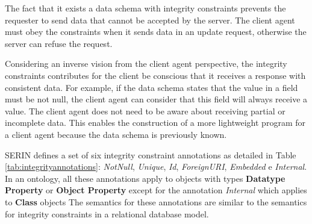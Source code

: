 \documentclass{singlecol-new}
\theoremstyle{TH}{
\newtheorem{lemma}{Lemma}
\newtheorem{theorem}[lemma]{Theorem}
\newtheorem{corrolary}[lemma]{Corrolary}
\newtheorem{conjecture}[lemma]{Conjecture}
\newtheorem{proposition}[lemma]{Proposition}
\newtheorem{claim}[lemma]{Claim}
\newtheorem{stheorem}[lemma]{Wrong Theorem}
\newtheorem{algorithm}{Algorithm}
}
\theoremstyle{THrm}{
\newtheorem{definition}{Definition}[section]
\newtheorem{question}{Question}[section]
\newtheorem{remark}{Remark}
\newtheorem{scheme}{Scheme}
}
\theoremstyle{THhit}{
\newtheorem{case}{Case}[section]
}
\begin{document}
The fact that it exists a data schema with integrity constraints prevents the requester to send data that cannot be accepted by the server. 
The client agent must obey the constraints when it sends data in an update request, otherwise the server can refuse the request.

Considering an inverse vision from the client agent perspective, the integrity constraints contributes for the client be conscious that it receives a response with consistent data.
For example, if the data schema states that the value in a field must be not null, the client agent can consider that this field will always receive a value. 
The client agent does not need to be aware about receiving partial or incomplete data. 
This enables the construction of a more lightweight program for a client agent because the data schema is previously known. 


SERIN defines a set of six integrity constraint annotations as detailed in Table \ref{tab:integrityannotations}: \textit{NotNull}, \textit{Unique}, \textit{Id}, \textit{ForeignURI}, \textit{Embedded} e \textit{Internal}. 
In an ontology, all these annotations apply to objects with types \textbf{Datatype Property} or \textbf{Object Property} except for the annotation \textit{Internal} which applies to \textbf{Class} objects
The semantics for these annotations are similar to the semantics for integrity constraints in a relational database model.
\end{document}
